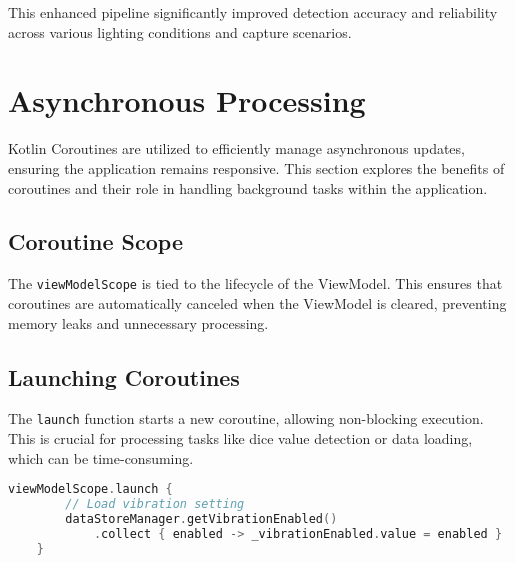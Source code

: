 This enhanced pipeline significantly improved detection accuracy and reliability across various lighting conditions and capture scenarios.

\section{Asynchronous Processing}

Kotlin Coroutines are utilized to efficiently manage asynchronous updates, ensuring the application remains responsive. This section explores the benefits of coroutines and their role in handling background tasks within the application.

\subsection{Coroutine Scope}

The \texttt{viewModelScope} is tied to the lifecycle of the ViewModel. This ensures that coroutines are automatically canceled when the ViewModel is cleared, preventing memory leaks and unnecessary processing.

\begin{figure}[ht!]
    \centering
\end{figure} 
\label{fig:lifecycle_viewmodelscope}

\subsection{Launching Coroutines}

The \texttt{launch} function starts a new coroutine, allowing non-blocking execution. This is crucial for processing tasks like dice value detection or data loading, which can be time-consuming.
\begin{lstlisting}[language=Kotlin, caption={Launching a Coroutine}, label=lst:launch_coroutine]
    viewModelScope.launch {
        // Load vibration setting
        dataStoreManager.getVibrationEnabled()
            .collect { enabled -> _vibrationEnabled.value = enabled }
    }
\end{lstlisting}

